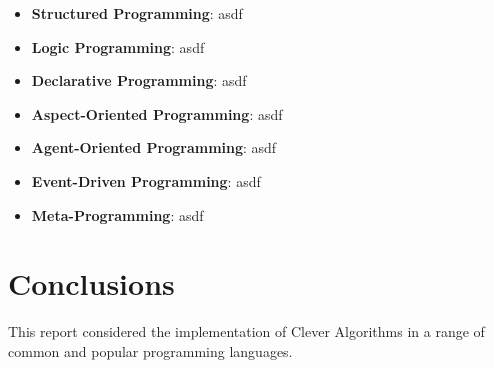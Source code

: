 \documentclass[a4paper, 11pt]{article}
\begin{document}
\begin{itemize}
	\item \textbf{Structured Programming}: asdf
	\item \textbf{Logic Programming}: asdf
	\item \textbf{Declarative Programming}: asdf
	\item \textbf{Aspect-Oriented Programming}: asdf
	\item \textbf{Agent-Oriented Programming}: asdf
	\item \textbf{Event-Driven Programming}: asdf
	\item \textbf{Meta-Programming}: asdf
\end{itemize}

\section{Conclusions}
\label{sec:conclusions}
This report considered the implementation of Clever Algorithms in a range of common and popular programming languages. 




\end{document}
